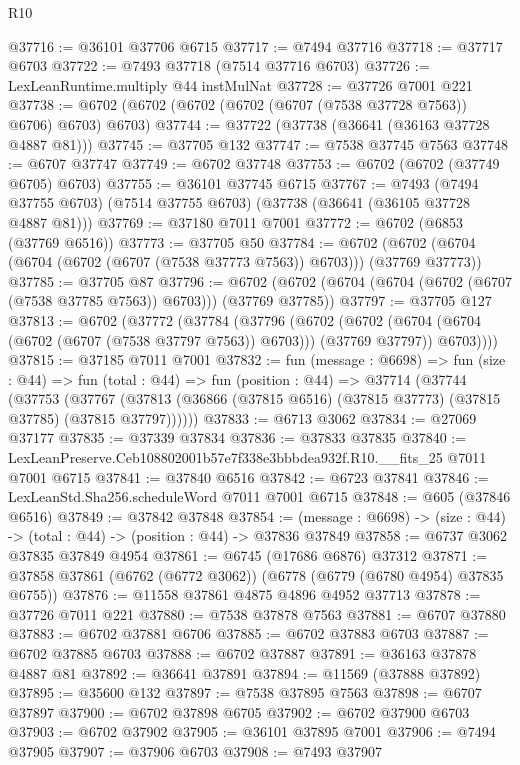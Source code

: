 \begin{lexlean}{R10}
\begin{coremodule}
@37716 := @36101 @37706 @6715
@37717 := @7494 @37716
@37718 := @37717 @6703
@37722 := @7493 @37718 (@7514 @37716 @6703)
@37726 := LexLeanRuntime.multiply @44 instMulNat
@37728 := @37726 @7001 @221
@37738 := @6702 (@6702 (@6702 (@6702 (@6707 (@7538 @37728 @7563)) @6706) @6703) @6703)
@37744 := @37722 (@37738 (@36641 (@36163 @37728 @4887 @81)))
@37745 := @37705 @132
@37747 := @7538 @37745 @7563
@37748 := @6707 @37747
@37749 := @6702 @37748
@37753 := @6702 (@6702 (@37749 @6705) @6703)
@37755 := @36101 @37745 @6715
@37767 := @7493
    (@7494 @37755 @6703)
    (@7514 @37755 @6703)
    (@37738 (@36641 (@36105 @37728 @4887 @81)))
@37769 := @37180 @7011 @7001
@37772 := @6702 (@6853 (@37769 @6516))
@37773 := @37705 @50
@37784 := @6702 (@6702 (@6704 (@6704 (@6702 (@6707 (@7538 @37773 @7563)) @6703))) (@37769 @37773))
@37785 := @37705 @87
@37796 := @6702 (@6702 (@6704 (@6704 (@6702 (@6707 (@7538 @37785 @7563)) @6703))) (@37769 @37785))
@37797 := @37705 @127
@37813 := @6702
    (@37772
      (@37784
        (@37796
          (@6702
            (@6702 (@6704 (@6704 (@6702 (@6707 (@7538 @37797 @7563)) @6703))) (@37769 @37797))
            @6703))))
@37815 := @37185 @7011 @7001
@37832 := fun (message : @6698) =>
  fun (size : @44) =>
  fun (total : @44) =>
  fun (position : @44) =>
  @37714
    (@37744
      (@37753
        (@37767 (@37813 (@36866 (@37815 @6516) (@37815 @37773) (@37815 @37785) (@37815 @37797))))))
@37833 := @6713 @3062
@37834 := @27069 @37177
@37835 := @37339 @37834
@37836 := @37833 @37835
@37840 := LexLeanPreserve.Ceb108802001b57e7f338e3bbbdea932f.R10.__fits_25 @7011 @7001 @6715
@37841 := @37840 @6516
@37842 := @6723 @37841
@37846 := LexLeanStd.Sha256.scheduleWord @7011 @7001 @6715
@37848 := @605 (@37846 @6516)
@37849 := @37842 @37848
@37854 := (message : @6698) -> (size : @44) -> (total : @44) -> (position : @44) -> @37836 @37849
@37858 := @6737 @3062 @37835 @37849 @4954
@37861 := @6745 (@17686 @6876) @37312
@37871 := @37858 @37861 (@6762 (@6772 @3062)) (@6778 (@6779 (@6780 @4954) @37835 @6755))
@37876 := @11558 @37861 @4875 @4896 @4952 @37713
@37878 := @37726 @7011 @221
@37880 := @7538 @37878 @7563
@37881 := @6707 @37880
@37883 := @6702 @37881 @6706
@37885 := @6702 @37883 @6703
@37887 := @6702 @37885 @6703
@37888 := @6702 @37887
@37891 := @36163 @37878 @4887 @81
@37892 := @36641 @37891
@37894 := @11569 (@37888 @37892)
@37895 := @35600 @132
@37897 := @7538 @37895 @7563
@37898 := @6707 @37897
@37900 := @6702 @37898 @6705
@37902 := @6702 @37900 @6703
@37903 := @6702 @37902
@37905 := @36101 @37895 @7001
@37906 := @7494 @37905
@37907 := @37906 @6703
@37908 := @7493 @37907

\end{coremodule}
\end{lexlean}
